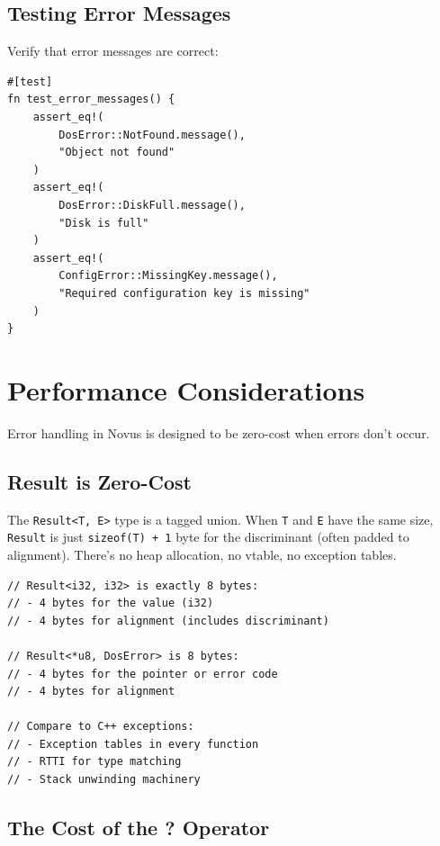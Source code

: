 \subsection{Testing Error Messages}

Verify that error messages are correct:

\begin{lstlisting}
#[test]
fn test_error_messages() {
    assert_eq!(
        DosError::NotFound.message(),
        "Object not found"
    )
    assert_eq!(
        DosError::DiskFull.message(),
        "Disk is full"
    )
    assert_eq!(
        ConfigError::MissingKey.message(),
        "Required configuration key is missing"
    )
}
\end{lstlisting}

\section{Performance Considerations}
\label{sec:error-performance}

Error handling in Novus is designed to be zero-cost when errors don't occur.

\subsection{Result is Zero-Cost}

The \texttt{Result<T, E>} type is a tagged union. When \texttt{T} and \texttt{E} have the same size, \texttt{Result} is just \texttt{sizeof(T) + 1} byte for the discriminant (often padded to alignment). There's no heap allocation, no vtable, no exception tables.

\begin{lstlisting}
// Result<i32, i32> is exactly 8 bytes:
// - 4 bytes for the value (i32)
// - 4 bytes for alignment (includes discriminant)

// Result<*u8, DosError> is 8 bytes:
// - 4 bytes for the pointer or error code
// - 4 bytes for alignment

// Compare to C++ exceptions:
// - Exception tables in every function
// - RTTI for type matching
// - Stack unwinding machinery
\end{lstlisting}

\subsection{The Cost of the ? Operator}

